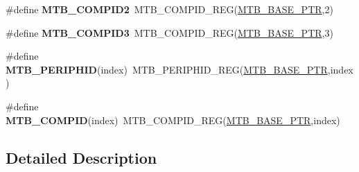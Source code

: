 \begin{DoxyCompactItemize}
\item 
\mbox{\label{group___m_t_b___register___accessor___macros_gae583594b06b5ef3ec80b99fa81d38738}} 
\#define {\bfseries M\+T\+B\+\_\+\+C\+O\+M\+P\+I\+D2}~M\+T\+B\+\_\+\+C\+O\+M\+P\+I\+D\+\_\+\+R\+EG(\hyperlink{group___m_t_b___peripheral_gadf7f362dfa67354951e6a23ddf08cd73}{M\+T\+B\+\_\+\+B\+A\+S\+E\+\_\+\+P\+TR},2)
\item 
\mbox{\label{group___m_t_b___register___accessor___macros_ga9bcae33e61ced6f8a480cb42bb9405af}} 
\#define {\bfseries M\+T\+B\+\_\+\+C\+O\+M\+P\+I\+D3}~M\+T\+B\+\_\+\+C\+O\+M\+P\+I\+D\+\_\+\+R\+EG(\hyperlink{group___m_t_b___peripheral_gadf7f362dfa67354951e6a23ddf08cd73}{M\+T\+B\+\_\+\+B\+A\+S\+E\+\_\+\+P\+TR},3)
\item 
\mbox{\label{group___m_t_b___register___accessor___macros_ga5bb7afd7b06403f99e12f9d0af0e9c29}} 
\#define {\bfseries M\+T\+B\+\_\+\+P\+E\+R\+I\+P\+H\+ID}(index)~M\+T\+B\+\_\+\+P\+E\+R\+I\+P\+H\+I\+D\+\_\+\+R\+EG(\hyperlink{group___m_t_b___peripheral_gadf7f362dfa67354951e6a23ddf08cd73}{M\+T\+B\+\_\+\+B\+A\+S\+E\+\_\+\+P\+TR},index)
\item 
\mbox{\label{group___m_t_b___register___accessor___macros_ga6ce2196becf81f9e85b957d6b4bbad75}} 
\#define {\bfseries M\+T\+B\+\_\+\+C\+O\+M\+P\+ID}(index)~M\+T\+B\+\_\+\+C\+O\+M\+P\+I\+D\+\_\+\+R\+EG(\hyperlink{group___m_t_b___peripheral_gadf7f362dfa67354951e6a23ddf08cd73}{M\+T\+B\+\_\+\+B\+A\+S\+E\+\_\+\+P\+TR},index)
\end{DoxyCompactItemize}


\subsection{Detailed Description}
